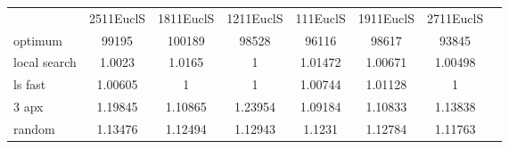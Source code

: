 \begin{tabular}[ht]{|l||c|c|c|c|c|c|H}
 & 2511EuclS & 1811EuclS & 1211EuclS & 111EuclS & 1911EuclS & 2711EuclS & \\  
optimum &99195 & 100189 & 98528 & 96116 & 98617 & 93845 & \\ 
local search &1.0023 & 1.0165 & 1 & 1.01472 & 1.00671 & 1.00498 & \\ 
ls fast &1.00605 & 1 & 1 & 1.00744 & 1.01128 & 1 & \\ 
3 apx &1.19845 & 1.10865 & 1.23954 & 1.09184 & 1.10833 & 1.13838 & \\ 
random &1.13476 & 1.12494 & 1.12943 & 1.1231 & 1.12784 & 1.11763 & \\ 
\end{tabular}
